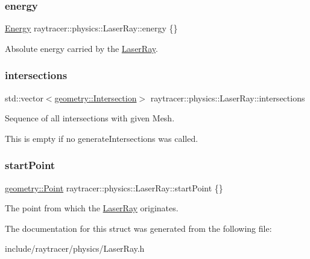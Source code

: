 \subsubsection{\texorpdfstring{energy}{energy}}
{\footnotesize\ttfamily \hyperlink{structraytracer_1_1physics_1_1Energy}{Energy} raytracer\+::physics\+::\+Laser\+Ray\+::energy \{\}}



Absolute energy carried by the \hyperlink{structraytracer_1_1physics_1_1LaserRay}{Laser\+Ray}. 

\mbox{\label{structraytracer_1_1physics_1_1LaserRay_a8d41ff2d7ea5212bd39d1c4ae8ffde7d}} 
\subsubsection{\texorpdfstring{intersections}{intersections}}
{\footnotesize\ttfamily std\+::vector$<$\hyperlink{structraytracer_1_1geometry_1_1Intersection}{geometry\+::\+Intersection}$>$ raytracer\+::physics\+::\+Laser\+Ray\+::intersections}



Sequence of all intersections with given Mesh. 

This is empty if no generate\+Intersections was called. \mbox{\label{structraytracer_1_1physics_1_1LaserRay_a7d81914ce19108013d4cd1dcf8c62216}} 
\subsubsection{\texorpdfstring{start\+Point}{startPoint}}
{\footnotesize\ttfamily \hyperlink{classraytracer_1_1geometry_1_1Point}{geometry\+::\+Point} raytracer\+::physics\+::\+Laser\+Ray\+::start\+Point \{\}}



The point from which the \hyperlink{structraytracer_1_1physics_1_1LaserRay}{Laser\+Ray} originates. 



The documentation for this struct was generated from the following file\+:\begin{DoxyCompactItemize}
\item 
include/raytracer/physics/Laser\+Ray.\+h\end{DoxyCompactItemize}
